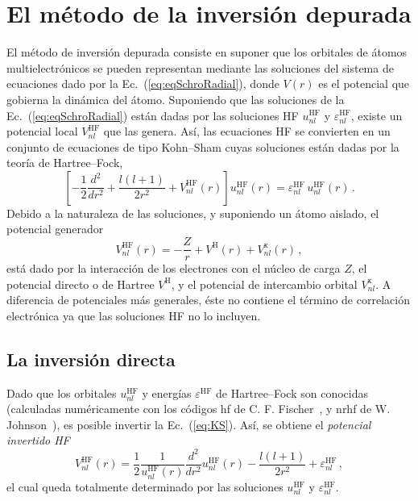 \section{El método de la inversión depurada}
\label{sec:dimatomos}

El método de inversión depurada consiste en suponer que los orbitales
de átomos multielectrónicos se pueden representan mediante las 
soluciones del sistema de ecuaciones dado por la 
Ec.~(\ref{eq:eqSchroRadial}), 
donde $V(r)$ es el potencial que gobierna la dinámica del átomo. 
Suponiendo que las soluciones de la Ec.~(\ref{eq:eqSchroRadial}) están 
dadas por las soluciones HF $u_{nl}^{\mathrm{HF}}$ y 
$\varepsilon_{nl}^{\mathrm{HF}}$, existe un potencial local 
$V_{nl}^{\mathrm{HF}}$ que las genera. Así, las ecuaciones HF se 
convierten en un conjunto de ecuaciones de tipo Kohn--Sham cuyas 
soluciones están dadas por la teoría de Hartree--Fock,
\begin{equation}
\left[ 
-\frac{1}{2}\frac{d^{2}}{dr^{2}} + \frac{l(l+1)}{2r^{2}} + 
V_{nl}^{\mathrm{HF}}(r) 
\right] u_{nl}^{\mathrm{HF}}(r)
   = \varepsilon_{nl}^{\mathrm{HF}}\, u_{nl}^{\mathrm{HF}}(r) \, .
\label{eq:KS}
\end{equation}
Debido a la naturaleza de las soluciones, y suponiendo un átomo aislado, 
el potencial generador 
\begin{equation}
V_{nl}^{\mathrm{HF}}(r) = -\frac{Z}{r} + 
V^{\mathrm{H}}(r) + V_{nl}^{\mathrm{x}}(r) \, ,  
\label{eq:veff}
\end{equation}
está dado por la interacción de los electrones con el núcleo de carga 
$Z$, el potencial directo o de Hartree $V^{\mathrm{H}}$, y el potencial 
de intercambio orbital $V_{nl}^{\mathrm{x}}$. A diferencia de 
potenciales más generales, éste no contiene el término de correlación 
electrónica ya que las soluciones HF no lo incluyen. 

\subsection{La inversión directa}
\label{subsec:inversion}

Dado que los orbitales $u_{nl}^{\mathrm{HF}}$ y energías  
$\varepsilon^{\mathrm{HF}}$ de Hartree--Fock son conocidas (calculadas 
numéricamente con los códigos {\sc hf} de C. F. 
Fischer~\cite{FroeseFischer:97}, y {\sc nrhf} de 
W. Johnson~\cite{Johnson:07}), es posible invertir la Ec.~(\ref{eq:KS}). 
Así, se obtiene el \textit{potencial invertido HF} 
\begin{equation}
V_{nl}^{\mathrm{HF}}(r) = 
\frac{1}{2}\frac{1}{u_{nl}^{\mathrm{HF}}(r)}
\frac{d^2}{dr^{2}}u_{nl}^{\mathrm{HF}}(r) - 
\frac{l(l+1)}{2r^{2}}+\varepsilon _{nl}^{\mathrm{HF}} \,,
\label{eq:VHF}
\end{equation}
el cual queda totalmente determinado por las soluciones 
$u_{nl}^{\mathrm{HF}}$ y $\varepsilon_{nl}^{\mathrm{HF}}$.


